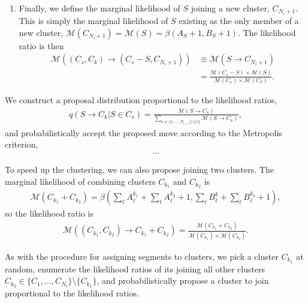 \documentclass[10pt,letter]{article}
\numberwithin{equation}{section}
\begin{document}
\begin{enumerate}
\item Finally, we define the marginal likelihood of $S$ joining a new cluster, $C_{N_i+1}$. This is simply the marginal likelihood of $S$ existing as the only member of a new cluster, $\mathcal{M}(C_{N_i+1}) = \mathcal{M}(S) = \beta(A_S+1,B_S+1)$. The likelihood ratio is then
\begin{align*}
\mathcal{M}((C_s,C_k)\to (C_s-S,C_{N_i+1})) &\equiv\mathcal{M}(S\to C_{N_i+1})\\
&= \frac{\mathcal{M}(C_s-S)\times\mathcal{M}(S)}{\mathcal{M}(C_s)\times\mathcal{M}(C_k)}.
\end{align*}
\end{enumerate}

We construct a proposal distribution proportional to the likelihood ratios,
\begin{align*}
q(S\to C_k|S\in C_s) = \frac{\mathcal{M}(S\to C_{k})}{\sum_{\kappa\in\{1,\dots,N_{i+1}\}\setminus\{s\}}\mathcal{M}(S\to C_{\kappa})},
\end{align*}
and probabilistically accept the proposed move according to the Metropolis criterion,
\begin{align*}
...
\end{align*}

To speed up the clustering, we can also propose joining two clusters. The marginal likelihood of combining clusters $C_{k_1}$ and $C_{k_2}$ is
\begin{align*}
\mathcal{M}(C_{k_1}+C_{k_2})=\beta(\textstyle\sum_{\ell}A^{k_1}_\ell + \textstyle\sum_{\ell}A^{k_2}_\ell + 1,\textstyle\sum_{\ell}B^k_\ell + \textstyle\sum_{\ell}B^{k_2}_\ell + 1),
\end{align*}
so the likelihood ratio is
\begin{align*}
\mathcal{M}((C_{k_1},C_{k_2})\to C_{k_1}+C_{k_2}) = \frac{\mathcal{M}(C_{k_1}+C_{k_2})}{\mathcal{M}(C_{k_1})\times \mathcal{M}(C_{k_2})}.
\end{align*}

As with the procedure for assigning segments to clusters, we pick a cluster $C_{k_1}$ at random, enumerate the likelihood ratios of its joining all other clusters $C_{k_2}\in\{C_1,\dots,C_{N_i}\}\setminus\{C_{k_1}\}$, and probabilistically propose a cluster to join proportional to the likelihood ratios.

%
%
%
\end{document}

